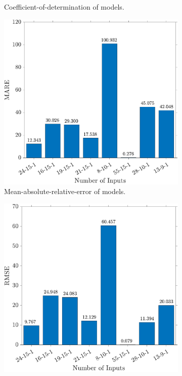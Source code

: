 \documentclass[
10pt, %
letterpaper, %
twoside, %
headinclude,footinclude, %
BCOR5mm, %
]{scrartcl}
\begin{document}
\begin{figure}[h!]
\begin{subfigure}[t]{0.49\linewidth}
		\caption{Coefficient-of-determination of models.} 
		\label{fig:RSQ}
	\end{subfigure}
	\begin{subfigure}[t]{0.49\linewidth}
		\centering
		\includegraphics[width=\linewidth]{figures/MARE.pdf}
		\caption{Mean-absolute-relative-error of models.} 
		\label{fig:MARE}
	\end{subfigure}
	\begin{subfigure}[t]{0.49\linewidth}
		\centering
		\includegraphics[width=\linewidth]{figures/RMS.pdf}

\end{subfigure}
\end{figure}
\end{document}
